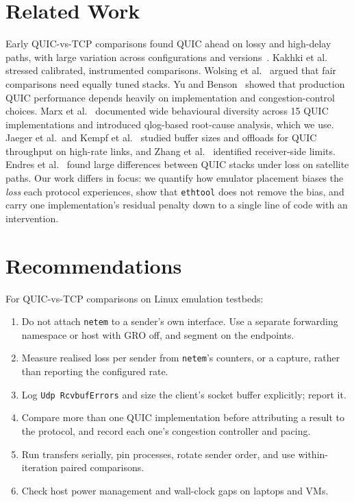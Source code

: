\documentclass[conference]{IEEEtran}
\begin{document}
\section{Related Work}\label{sec:related}
Early QUIC-vs-TCP comparisons found QUIC ahead on lossy and high-delay paths, with large variation across configurations
and versions~\cite{langley2017quic,megyesi2016quick,biswal2016quic,kakhki2017long}. Kakhki et al.~\cite{kakhki2017long}
stressed calibrated, instrumented comparisons. Wolsing et al.~\cite{wolsing2019performance} argued that fair comparisons
need equally tuned stacks. Yu and Benson~\cite{yu2021dissecting} showed that production QUIC performance depends heavily on
implementation and congestion-control choices. Marx et al.~\cite{marx2020same} documented wide behavioural diversity
across 15 QUIC implementations and introduced qlog-based root-cause analysis, which we use. Jaeger et al.\ and Kempf et
al.~\cite{jaeger2023highway,kempf2024fastlane} studied buffer sizes and offloads for QUIC throughput on high-rate links,
and Zhang et al.~\cite{zhang2024quic} identified receiver-side limits. Endres et al.~\cite{endres2022satellite} found large
differences between QUIC stacks under loss on satellite paths. Our work differs in focus: we quantify how emulator
placement biases the \emph{loss} each protocol experiences, show that \texttt{ethtool} does not remove the bias, and carry
one implementation's residual penalty down to a single line of code with an intervention.

\section{Recommendations}\label{sec:recs}
For QUIC-vs-TCP comparisons on Linux emulation testbeds:
\begin{enumerate}
\item Do not attach \texttt{netem} to a sender's own interface. Use a separate forwarding namespace or host with GRO off,
and segment on the endpoints.
\item Measure realised loss per sender from \texttt{netem}'s counters, or a capture, rather than reporting the configured rate.
\item Log \texttt{Udp RcvbufErrors} and size the client's socket buffer explicitly; report it.
\item Compare more than one QUIC implementation before attributing a result to the protocol, and record each one's
congestion controller and pacing.
\item Run transfers serially, pin processes, rotate sender order, and use within-iteration paired comparisons.
\item Check host power management and wall-clock gaps on laptops and VMs.
\end{enumerate}
\end{document}
